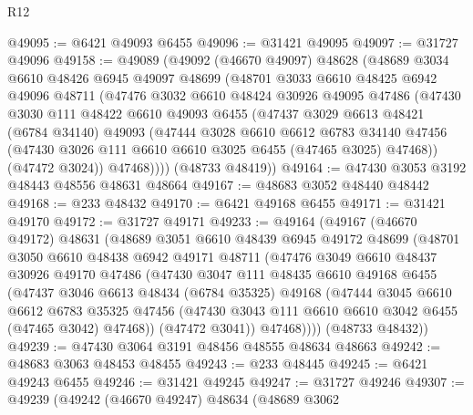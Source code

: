 \begin{lexlean}{R12}
\begin{coremodule}
@49095 := @6421 @49093 @6455
@49096 := @31421 @49095
@49097 := @31727 @49096
@49158 := @49089
    (@49092
      (@46670 @49097)
      @48628
      (@48689
        @3034
        @6610
        @48426
        @6945
        @49097
        @48699
        (@48701
          @3033
          @6610
          @48425
          @6942
          @49096
          @48711
          (@47476
            @3032
            @6610
            @48424
            @30926
            @49095
            @47486
            (@47430
              @3030
              @111
              @48422
              @6610
              @49093
              @6455
              (@47437
                @3029
                @6613
                @48421
                (@6784 @34140)
                @49093
                (@47444
                  @3028
                  @6610
                  @6612
                  @6783
                  @34140
                  @47456
                  (@47430 @3026 @111 @6610 @6610 @3025 @6455 (@47465 @3025) @47468))
                (@47472 @3024))
              @47468))))
      (@48733 @48419))
@49164 := @47430 @3053 @3192 @48443 @48556 @48631 @48664
@49167 := @48683 @3052 @48440 @48442
@49168 := @233 @48432
@49170 := @6421 @49168 @6455
@49171 := @31421 @49170
@49172 := @31727 @49171
@49233 := @49164
    (@49167
      (@46670 @49172)
      @48631
      (@48689
        @3051
        @6610
        @48439
        @6945
        @49172
        @48699
        (@48701
          @3050
          @6610
          @48438
          @6942
          @49171
          @48711
          (@47476
            @3049
            @6610
            @48437
            @30926
            @49170
            @47486
            (@47430
              @3047
              @111
              @48435
              @6610
              @49168
              @6455
              (@47437
                @3046
                @6613
                @48434
                (@6784 @35325)
                @49168
                (@47444
                  @3045
                  @6610
                  @6612
                  @6783
                  @35325
                  @47456
                  (@47430 @3043 @111 @6610 @6610 @3042 @6455 (@47465 @3042) @47468))
                (@47472 @3041))
              @47468))))
      (@48733 @48432))
@49239 := @47430 @3064 @3191 @48456 @48555 @48634 @48663
@49242 := @48683 @3063 @48453 @48455
@49243 := @233 @48445
@49245 := @6421 @49243 @6455
@49246 := @31421 @49245
@49247 := @31727 @49246
@49307 := @49239
    (@49242
      (@46670 @49247)
      @48634
      (@48689
        @3062

\end{coremodule}
\end{lexlean}
